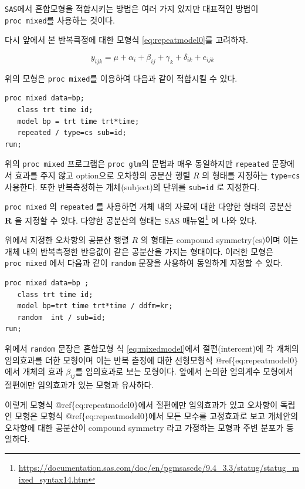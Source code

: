 \documentclass[
]{book}
\renewcommand{\href}[2]{#2\footnote{\url{#1}}}
\theoremstyle{definition}
\theoremstyle{definition}
\theoremstyle{definition}
\theoremstyle{remark}
\begin{document}
\texttt{SAS}에서 혼합모형을 적함시키는 방법은 여러 가지 있지만 대표적인 방법이
\texttt{proc\ mixed}를 사용하는 것이다.

다시 앞에서 본 반복큭정에 대한 모형식 \eqref{eq:repeatmodel0}를 고려하자.

\[
y_{ijk} = \mu + \alpha_i + \beta_{ij} + \gamma_k + \delta_{ik} + e_{ijk} 
\]

위의 모형은 \texttt{proc\ mixed}를 이용하여 다음과 같이 적합시킬 수 있다.

\begin{verbatim}
proc mixed data=bp;
   class trt time id;
   model bp = trt time trt*time;
   repeated / type=cs sub=id;
run;
\end{verbatim}

위의 \texttt{proc\ mixed} 프로그램은 \texttt{proc\ glm}의 문법과 매우 동일하지만 \texttt{repeated} 문장에서 효과를 주지 않고 option으로 오차항의 공분산 행렬 \(R\) 의 형태를 지정하는 \texttt{type=cs} 사용한다. 또한 반복측정하는 개체(subject)의 단위를 \texttt{sub=id} 로 지정한다.

\texttt{proc\ mixed} 의 \texttt{repeated} 를 사용하면 개체 내의 자료에 대한 다양한 형태의 공분산 \(\bm R\) 을 지정할 수 있다. 다양한 공분산의 형태는 \href{https://documentation.sas.com/doc/en/pgmsascdc/9.4_3.3/statug/statug_mixed_syntax14.htm}{SAS 매뉴얼} 에 나와 있다.

위에서 지정한 오차항의 공분산 행렬 \(R\) 의 형태는 compound symmetry(cs)이며 이는 개체 내의 반복측정한 반응값이 같은 공분산을 가지는 형태이다. 이러한 모형은 \texttt{proc\ mixed} 에서 다음과 같이 \texttt{random} 문장을 사용하여 동일하게 지정할 수 있다.

\begin{verbatim}
proc mixed data=bp ;
   class trt time id;
   model bp=trt time trt*time / ddfm=kr;
   random  int / sub=id;
run;
\end{verbatim}

위에서 \texttt{random} 문장은 혼함모형 식 \eqref{eq:mixedmodel}에서 절편(intercent)에 각 개체의 임의효과를 더한 모형이며 이는 반복 츧정에 대한 선형모형식
@ref\{eq:repeatmodel0\}에서 개체의 효과 \(\beta_{ij}\)를 임의효과로 보는 모형이다. 앞에서 논의한 임의게수 모형에서 절편에만 임의효과가 있는 모형과 유사하다.

이렇게 모형식 @ref\{eq:repeatmodel0\}에서 절편에만 임의효과가 있고 오차항이 독립인 모형은 모형식 @ref\{eq:repeatmodel0\}에서 모든 모수를 고정효과로 보고 개체안의 오차항에 대한 공분산이 compound symmetry 라고 가정하는 모형과 주변 분포가 동일하다.
\end{document}
